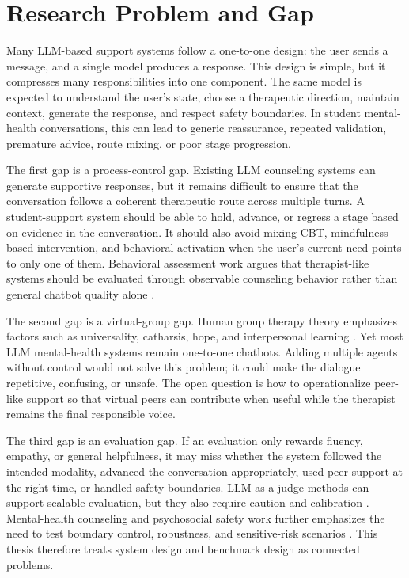 \section{Research Problem and Gap}

Many LLM-based support systems follow a one-to-one design: the user sends a message, and a single model produces a response. This design is simple, but it compresses many responsibilities into one component. The same model is expected to understand the user's state, choose a therapeutic direction, maintain context, generate the response, and respect safety boundaries. In student mental-health conversations, this can lead to generic reassurance, repeated validation, premature advice, route mixing, or poor stage progression.

The first gap is a process-control gap. Existing LLM counseling systems can generate supportive responses, but it remains difficult to ensure that the conversation follows a coherent therapeutic route across multiple turns. A student-support system should be able to hold, advance, or regress a stage based on evidence in the conversation. It should also avoid mixing CBT, mindfulness-based intervention, and behavioral activation when the user's current need points to only one of them. Behavioral assessment work argues that therapist-like systems should be evaluated through observable counseling behavior rather than general chatbot quality alone \citep{Chiu2024LLMTherapists}.

The second gap is a virtual-group gap. Human group therapy theory emphasizes factors such as universality, catharsis, hope, and interpersonal learning \citep{Yalom2020GroupPsychotherapy}. Yet most LLM mental-health systems remain one-to-one chatbots. Adding multiple agents without control would not solve this problem; it could make the dialogue repetitive, confusing, or unsafe. The open question is how to operationalize peer-like support so that virtual peers can contribute when useful while the therapist remains the final responsible voice.

The third gap is an evaluation gap. If an evaluation only rewards fluency, empathy, or general helpfulness, it may miss whether the system followed the intended modality, advanced the conversation appropriately, used peer support at the right time, or handled safety boundaries. LLM-as-a-judge methods can support scalable evaluation, but they also require caution and calibration \citep{Zheng2023LLMJudge}. Mental-health counseling and psychosocial safety work further emphasizes the need to test boundary control, robustness, and sensitive-risk scenarios \citep{Li2025CounselBench,Luo2025DialogGuard}. This thesis therefore treats system design and benchmark design as connected problems.

